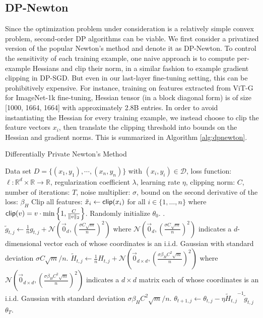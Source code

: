 \documentclass[letterpaper]{article} \usepackage{fullpage}
\def\cD{\mathcal{D}}
\def\calN{\mathcal{N}}
\def\cardD{n}
\begin{document}
\subsection{DP-Newton}
Since the optimization problem under consideration is a relatively simple convex problem, second-order DP algorithms can be viable. We first consider a privatized version of the popular Newton's method and denote it as DP-Newton. To control the sensitivity of each training example, one naive approach is to compute per-example Hessians and clip their norm, in a similar fashion to example gradient clipping in DP-SGD. But even in our last-layer fine-tuning setting, this can be prohibitively expensive. For instance, training on features extracted from ViT-G for ImageNet-1k fine-tuning, Hessian tensor (in a block diagonal form) is of size [1000, 1664, 1664] with approximately 2.8B entries. In order to avoid instantiating the Hessian for every training example, we instead choose to clip the feature vectors $x_i$, then translate the clipping threshold into bounds on the Hessian and gradient norms. This is summarized in Algorithm \ref{alg:dpnewton}.

\begin{algorithm}[ht]
\caption{Differentially Private Newton's Method}
\begin{algorithmic}[1]

\REQUIRE Data set $D=\{(x_1, y_1),\cdots,(x_n, y_n)\}$ with $(x_i, y_i)\in \cD$, loss function: $\ell:\mathbb{R}^d\times\mathbb{R}\to\mathbb{R}$, regularization coefficient $\lambda$, learning rate $\eta$, clipping norm: $C$, 
number of iterations: $T$, noise multiplier: $\sigma$, bound on the second derivative of the loss: $\beta_H$
\STATE Clip all features: $\tilde x_i\leftarrow {\sf clip}(x_i)$ for all $i\in\{1,\dots,n\}$ where {${\sf clip}(v)=v\cdot\min\left\{1,\frac{C}{\|v\|_2}\right\}$}.
\STATE Randomly initialize $\theta_0$.
{}.
{}
{\STATE $\tilde g_{t,j} \leftarrow \frac{1}{\cardD} g_{t,j}+\calN\left(\vec{0}_{d},(\frac{\sigma C \sqrt{m}}{\cardD})^2\right)$ where $\calN\left(\vec{0}_{d},(\frac{\sigma C \sqrt{m}}{\cardD})^2\right)$ indicates a $d$-dimensional vector each of whose coordinates is an i.i.d. Gaussian with standard deviation $\sigma C \sqrt{m}/\cardD$.\label{line:gradN}}
{\STATE $\tilde H_{t,j} \leftarrow \frac{1}{\cardD} H_{t,j}+\calN\left(\vec{0}_{d\times d},\left(\frac{\sigma \beta_H C^2 \sqrt{m}}{\cardD}\right)^2\right)$ where $\calN\left(\vec{0}_{d\times d},\left(\frac{\sigma \beta_H C^2  \sqrt{m}}{\cardD}\right)^2\right)$ indicates a $d\times d$ matrix each of whose coordinates is an i.i.d. Gaussian with standard deviation $\sigma \beta_H C^2 \sqrt{m}/\cardD$.\label{line:hessN}}
{\STATE $\theta_{t+1,j} \leftarrow \theta_{t,j} - \eta {\tilde H_{t,j}}^{-1} \tilde g_{t,j}$ \label{line:newton-solution}}
\ENDFOR
\ENDFOR
{ $\theta_T$\label{eq:lastDPSGD}.}
\end{algorithmic}
\label{alg:dpnewton}
\end{algorithm}
\end{document}

